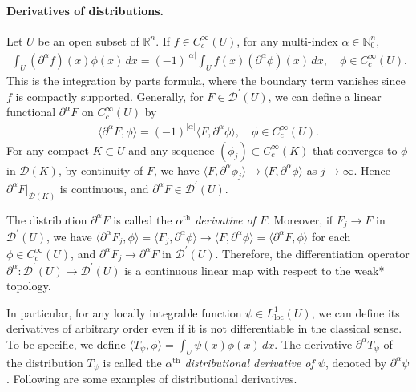 \documentclass{article}
\numberwithin{equation}{section}
\newcommand{\bbN}{\mathbb{N}}
\newcommand{\bbR}{\mathbb{R}}
\renewcommand{\cal}{\mathcal}
\newcommand{\loc}{\mathrm{loc}}
\theoremstyle{plain}
\theoremstyle{definition}
\begin{document}
\paragraph{Derivatives of distributions.} Let $U$ be an open subset of $\bbR^n$. If $f\in C_c^\infty(U)$, for any multi-index $\alpha\in\bbN_0^n$,
\begin{align*}
	\int_U(\partial^\alpha f)(x)\phi(x)\,dx=(-1)^{\vert\alpha\vert}\int_U f(x)(\partial^\alpha\phi)(x)\,dx,\quad \phi\in C_c^\infty(U).
\end{align*}
This is the integration by parts formula, where the boundary term vanishes since $f$ is compactly supported. Generally, for $F\in\cal{D}^\prime(U)$, we can define a linear functional $\partial^\alpha F$ on $C_c^\infty(U)$ by
\begin{align*}
	\langle\partial^\alpha F,\phi\rangle=(-1)^{\vert\alpha\vert}\langle F,\partial^\alpha\phi\rangle,\quad\phi\in C_c^\infty(U).
\end{align*}
For any compact $K\subset U$ and any sequence $(\phi_j)\subset C_c^\infty(K)$ that converges to $\phi$ in $\cal{D}(K)$, by continuity of $F$, we have $\langle F,\partial^\alpha\phi_j\rangle\to\langle F,\partial^\alpha\phi\rangle$ as $j\to\infty$. Hence $\partial^\alpha F|_{\cal{D}(K)}$ is continuous, and $\partial^\alpha F\in\cal{D}^\prime(U)$.

The distribution $\partial^\alpha F$ is called the \textit{$\alpha^\text{th}$ derivative of $F$}. Moreover, if $F_j\to F$ in $\cal{D}^\prime(U)$, we have $\langle\partial^\alpha F_j,\phi\rangle=\langle F_j,\partial^\alpha\phi\rangle\to\langle F,\partial^\alpha\phi\rangle=\langle \partial^\alpha F,\phi\rangle$ for each $\phi\in C_c^\infty(U)$, and $\partial^\alpha F_j\to\partial^\alpha F$ in $\cal{D}^\prime(U)$. Therefore, the differentiation operator $\partial^\alpha:\cal{D}^\prime(U)\to\cal{D}^\prime(U)$ is a continuous linear map with respect to the weak* topology. 

In particular, for any locally integrable function $\psi\in L^1_\loc(U)$, we can define its derivatives of arbitrary order even if it is not differentiable in the classical sense. To be specific, we define $\langle T_\psi,\phi\rangle=\int_U\psi(x)\phi(x)\,dx$. The derivative $\partial^\alpha T_\psi$ of the distribution $T_\psi$ is called the \textit{$\alpha^\text{th}$ distributional derivative of $\psi$}, denoted by $\partial^\alpha\psi$. Following are some examples of distributional derivatives.
\end{document}
